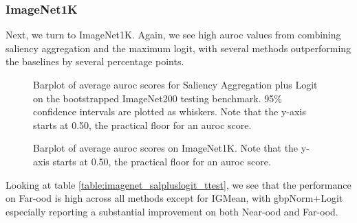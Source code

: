 \documentclass[UKenglish]{uiomasterthesis} %
\theoremstyle{definition}
\begin{document}
%
%
%

\subsubsection{ImageNet1K}

Next, we turn to ImageNet1K. Again, we see high \ac{auroc} values from combining saliency aggregation and the maximum logit, with several methods outperforming the baselines by several percentage points.

\begin{figure}[H]
    \begin{center}
        
    \end{center}
    \caption[ImageNet200 Saliency Aggregation plus Logit Bootstrap]{Barplot of average \ac{auroc} scores for Saliency Aggregation plus Logit on the bootstrapped ImageNet200 testing benchmark. 95\% confidence intervals are plotted as whiskers. Note that the y-axis starts at 0.50, the practical floor for an \ac{auroc} score.}
    \caption[Average scores]{Barplot of average \ac{auroc} scores on ImageNet1K. Note that the y-axis starts at 0.50, the practical floor for an \ac{auroc} score.}
    \label{fig:imagenet_salpluslogit_bootstrap_barplot}
\end{figure}

Looking at table \ref{table:imagenet_salpluslogit_ttest}, we see that the performance on Far-\ac{ood} is high across all methods except for IGMean, with \ac{gbp}Norm+Logit especially reporting a substantial improvement on both Near-\ac{ood} and Far-\ac{ood}. 
\end{document}
